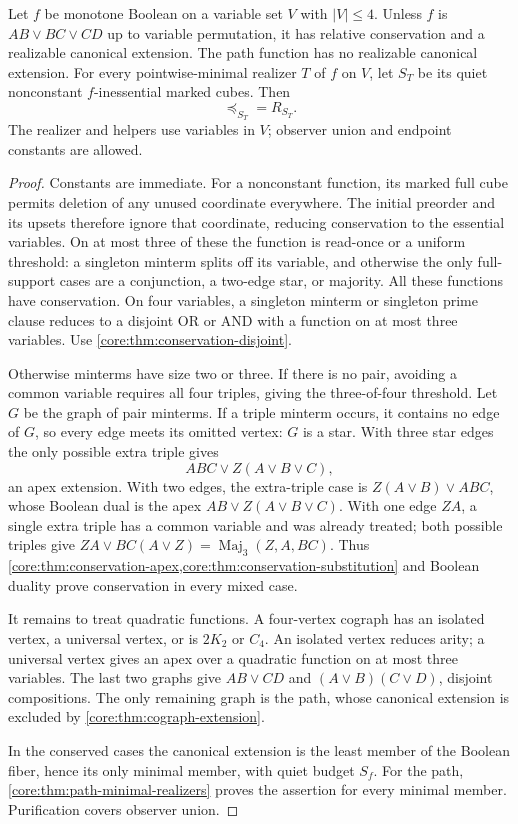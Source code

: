 \begin{theorem}
\label{core:thm:four-variable-conservation}
Let $f$ be monotone Boolean on a variable set $V$ with $|V|\leq4$.
Unless $f$ is
$AB\vee BC\vee CD$ up to variable permutation, it has relative
conservation and a realizable canonical extension. The path function has
no realizable canonical extension.
For every pointwise-minimal realizer $T$ of $f$ on $V$, let $S_T$ be
its quiet nonconstant $f$-inessential marked cubes. Then
\[
 \preceq_{S_T}=R_{S_T}.
\]
The realizer and helpers use variables in $V$; observer union and
endpoint constants are allowed.
\end{theorem}
\begin{proof}
Constants are immediate. For a nonconstant function, its marked full cube
permits deletion of any unused coordinate everywhere. The initial preorder
and its upsets therefore ignore that coordinate, reducing conservation
to the essential variables. On at most three of these the function is
read-once or a uniform threshold:
a singleton minterm splits off its variable, and otherwise the only
full-support cases are a conjunction, a two-edge star, or majority.
All these functions have conservation.
On four variables, a singleton minterm or singleton prime clause reduces
to a disjoint OR or AND with a function on at most three variables.
Use \cref{core:thm:conservation-disjoint}.

Otherwise minterms have size two or three. If there is no pair, avoiding
a common variable requires all four triples, giving the three-of-four
threshold. Let $G$ be the graph of pair minterms. If a triple minterm
occurs, it contains no edge of $G$, so every edge meets its omitted
vertex: $G$ is a star. With three star edges the only possible extra
triple gives
\[
 ABC\vee Z(A\vee B\vee C),
\]
an apex extension. With two edges, the extra-triple case is
$Z(A\vee B)\vee ABC$, whose Boolean dual is the apex
$AB\vee Z(A\vee B\vee C)$. With one edge $ZA$, a single extra triple
has a common variable and was already treated; both possible triples give
$ZA\vee BC(A\vee Z)=\operatorname{Maj}_3(Z,A,BC)$.
Thus \cref{core:thm:conservation-apex,core:thm:conservation-substitution}
and Boolean duality prove conservation in every mixed case.

It remains to treat quadratic functions. A four-vertex cograph has an
isolated vertex, a universal vertex, or is $2K_2$ or $C_4$.
An isolated vertex reduces arity; a universal vertex gives an apex
over a quadratic function on at most three variables. The last two
graphs give $AB\vee CD$ and $(A\vee B)(C\vee D)$, disjoint compositions.
The only remaining graph is the path, whose canonical extension is
excluded by \cref{core:thm:cograph-extension}.

In the conserved cases the canonical extension is the least member of
the Boolean fiber, hence its only minimal member, with quiet budget
$S_f$. For the path, \cref{core:thm:path-minimal-realizers} proves the
assertion for every minimal member. Purification covers observer union.
\end{proof}

